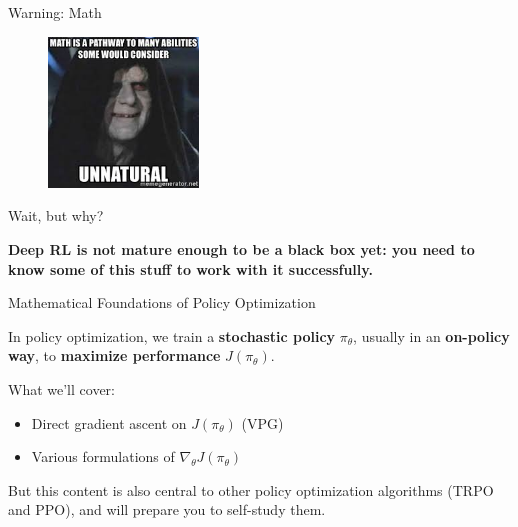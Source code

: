 \documentclass[9pt]{beamer}
\begin{document}
\begin{frame}{Warning: Math}

\begin{figure}
\centering
\includegraphics[width=4cm]{palpatine}
\end{figure}

\end{frame}

\begin{frame}{Wait, but why?}


\textbf{Deep RL is not mature enough to be a black box yet: you need to know some of this stuff to work with it successfully.}

\end{frame}

\begin{frame}{Mathematical Foundations of Policy Optimization}

In policy optimization, we train a \textbf{stochastic policy} $\pi_{\theta}$, usually in an \textbf{on-policy way}, to \textbf{maximize performance} $J(\pi_{\theta})$.

\vspace{1em}

What we'll cover:
\begin{itemize}
\item Direct gradient ascent on $J(\pi_{\theta})$ (VPG)
\item Various formulations of $\nabla_{\theta} J(\pi_{\theta})$
\end{itemize}

\vspace{1em}
But this content is also central to other policy optimization algorithms (TRPO and PPO), and will prepare you to self-study them.
\end{frame}
\end{document}
